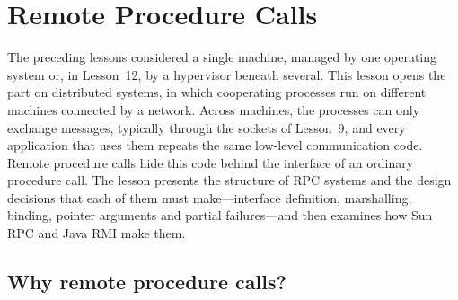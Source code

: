 \documentclass[../main.tex]{subfiles}
\begin{document}
\chapter{Remote Procedure Calls}

The preceding lessons considered a single machine, managed by one
operating system or, in Lesson~12, by a hypervisor beneath several.  This
lesson opens the part on distributed systems, in which cooperating
processes run on different machines connected by a network.  Across
machines, the processes can only exchange messages, typically through the
sockets of Lesson~9, and every application that uses them repeats the same
low-level communication code.  Remote procedure calls hide this code behind
the interface of an ordinary procedure call.  The lesson presents the
structure of RPC systems and the design decisions that each of them must
make---interface definition, marshalling, binding, pointer arguments and
partial failures---and then examines how Sun RPC and Java RMI make them.

\section{Why remote procedure calls?}
\label{sec:l13-why}
\end{document}
